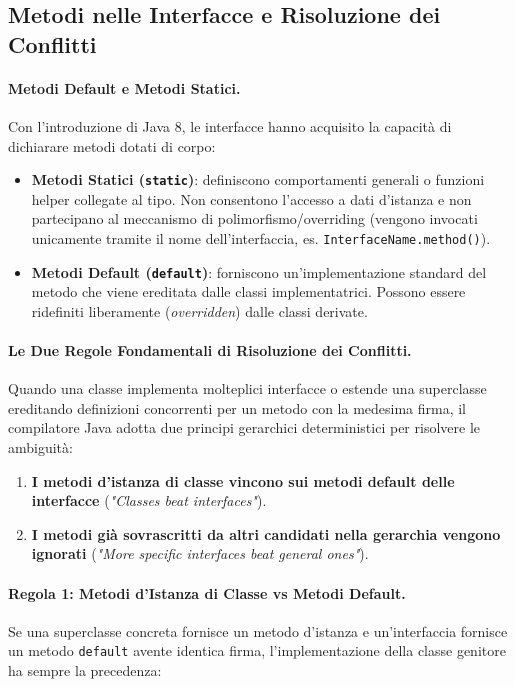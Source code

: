 \documentclass[12pt]{extarticle}
\begin{document}
\subsection{Metodi nelle Interfacce e Risoluzione dei Conflitti}

\paragraph{Metodi Default e Metodi Statici.}
Con l'introduzione di Java 8, le interfacce hanno acquisito la capacità di dichiarare metodi dotati di corpo:
\begin{itemize}
    \item \textbf{Metodi Statici (\texttt{static})}: definiscono comportamenti generali o funzioni helper collegate al tipo. Non consentono l'accesso a dati d'istanza e non partecipano al meccanismo di polimorfismo/overriding (vengono invocati unicamente tramite il nome dell'interfaccia, es. \texttt{InterfaceName.method()}).
    \item \textbf{Metodi Default (\texttt{default})}: forniscono un'implementazione standard del metodo che viene ereditata dalle classi implementatrici. Possono essere ridefiniti liberamente (\textit{overridden}) dalle classi derivate.
\end{itemize}

\paragraph{Le Due Regole Fondamentali di Risoluzione dei Conflitti.}
Quando una classe implementa molteplici interfacce o estende una superclasse ereditando definizioni concorrenti per un metodo con la medesima firma, il compilatore Java adotta due principi gerarchici deterministici per risolvere le ambiguità:
\begin{enumerate}
    \item \textbf{I metodi d'istanza di classe vincono sui metodi default delle interfacce} (\textit{"Classes beat interfaces"}).
    \item \textbf{I metodi già sovrascritti da altri candidati nella gerarchia vengono ignorati} (\textit{"More specific interfaces beat general ones"}).
\end{enumerate}

\paragraph{Regola 1: Metodi d'Istanza di Classe vs Metodi Default.}
Se una superclasse concreta fornisce un metodo d'istanza e un'interfaccia fornisce un metodo \texttt{default} avente identica firma, l'implementazione della classe genitore ha sempre la precedenza:
\end{document}
